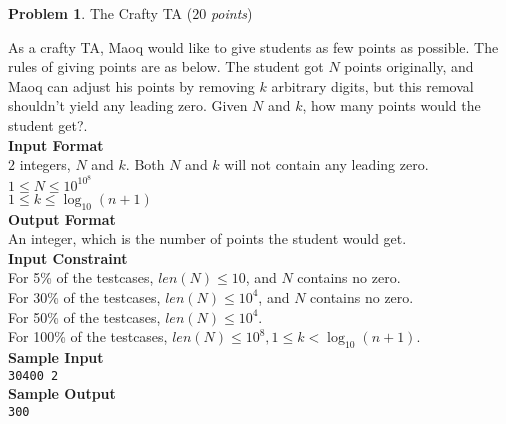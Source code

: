 \documentclass[12pt,a4paper]{report}
\newcommand{\points}[1]{ ($#1$ \textit{points}) }
\theoremstyle{definition}
\newtheorem{problem}{\textbf{Problem}}
\theoremstyle{definition}
\begin{document}
\begin{problem}The Crafty TA \points{20}

As a crafty TA, Maoq would like to give students as few points as possible. The rules of giving points are as below.
The student got $N$ points originally, and Maoq can adjust his points by removing $k$ arbitrary digits, but this removal shouldn't yield any leading zero. Given $N$ and $k$, how many points would the student get?.\\

\textbf{\large Input Format}\\
$2$ integers, $N$ and $k$. Both $N$ and $k$ will not contain any leading zero.\\
$1\leq N\leq 10^{10^8}$\\
$1\leq k\leq\log_{10}(n+1)$\\

\textbf{\large Output Format}\\
An integer, which is the number of points the student would get.\\

\textbf{\large Input Constraint}\\
For 5\% of the testcases, $len(N)\leq 10$, and $N$ contains no zero.\\
For 30\% of the testcases, $len(N)\leq 10^4$, and $N$ contains no zero.\\
For 50\% of the testcases, $len(N)\leq 10^4$.\\
For 100\% of the testcases, $len(N)\leq 10^8, 1\leq k< \log_{10}(n+1)$.\\

\textbf{\large Sample Input}\\
\texttt{30400 2}\\

\textbf{\large Sample Output}\\
\texttt{300}\\
\end{problem}
\end{document}
